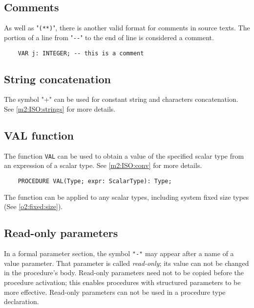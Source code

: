 \subsection{Comments}

\oextonly

As well as "\verb|(**)|", there is another valid format for  comments  in
source texts. The portion of a line from "\verb|--|"
to the end of line is considered a comment.

\verb'    VAR j: INTEGER; -- this is a comment'

\subsection{String concatenation}

\oextonly

The symbol "+" can be used for constant string and characters
concatenation. See \ref{m2:ISO:strings} for more details.

\subsection{VAL function}

\oextonly

The function \verb'VAL' can be used to obtain a value of the specified
scalar type from an expression of a scalar type.
See \ref{m2:ISO:conv} for more details.

\verb'    PROCEDURE VAL(Type; expr: ScalarType): Type;'

The function can be applied to any scalar types,
including system fixed size types (See \ref{o2:fixed:size}).

\subsection{Read-only parameters}

\oextonly

In a formal parameter section, the symbol \verb|"-"|
may appear after a name of a value parameter.
That parameter is called {\em read-only}; its value
can not be changed in the procedure's body.
Read-only parameters need not to be
copied before the procedure activation;
this enables procedures with structured parameters
to be more effective.
Read-only parameters can not be used in a procedure type declaration.

